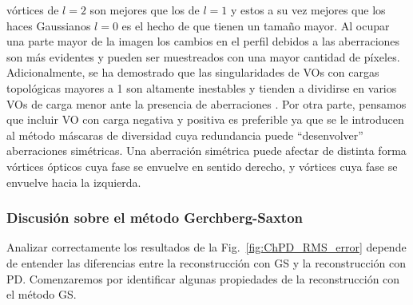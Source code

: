 vórtices de $l=2$ son mejores que los de $l=1$ y estos a su vez
mejores que los haces Gaussianos $l=0$ es el hecho de que tienen un
tamaño mayor. Al ocupar una parte mayor de la imagen los cambios en el
perfil debidos a las aberraciones son más evidentes y pueden ser
muestreados con una mayor cantidad de píxeles. Adicionalmente, se ha
demostrado que las
singularidades de VOs con cargas topológicas mayores a 1 son altamente
inestables y tienden a
dividirse en varios VOs de carga menor ante la presencia de
aberraciones . Por otra parte, pensamos que 
incluir VO con carga negativa y positiva es preferible ya que se le
introducen al método máscaras de diversidad cuya redundancia puede ``desenvolver''
aberraciones simétricas. Una aberración simétrica puede afectar de
distinta forma vórtices ópticos cuya fase se envuelve en sentido
derecho, y vórtices cuya fase se envuelve hacia la izquierda.

\subsubsection{Discusión sobre el método Gerchberg-Saxton}
Analizar correctamente los resultados de la Fig.~\ref{fig:ChPD_RMS_error} depende de entender las diferencias entre la
reconstrucción con GS y la reconstrucción con PD. Comenzaremos por
identificar algunas propiedades de la reconstrucción con el método GS.

